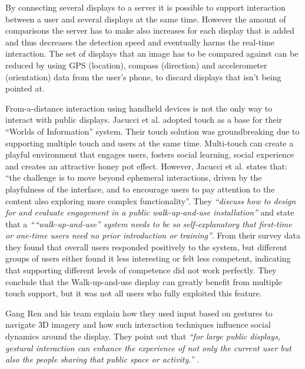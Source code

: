 By connecting several displays  to a server it is possible to support interaction between a user and several displays at the same time. However the amount of comparisons the server has to make also increases for each display that is added and thus decreases the detection speed and eventually harms the real-time interaction. The set of displays that an image has to be compared against can be reduced by using GPS (location), compass (direction) and accelerometer (orientation) data from the user's phone, to discard displays that isn't being pointed at.

From-a-distance interaction using handheld devices is not the only way to interact with public displays. %
Jacucci et al. adopted touch as a base for their ``Worlds of Information'' system. Their touch solution was groundbreaking due to supporting multiple touch and users at the same time. Multi-touch can create a playful environment that engages users, fosters social learning, social experience and creates an attractive honey pot effect. However, Jacucci et al. states that: ``the challenge is to move beyond ephemeral interactions, driven by the playfulness of 
the interface, and to encourage users to pay attention to the content also exploring more complex functionality''\cite{Jacucci:2010}.
They \emph{``discuss how to design for and evaluate engagement in a public walk-up-and-use installation''} and state that a \emph{````walk-up-and-use'' system needs to be so self-explanatory that first-time or one-time users need no prior introduction or training''}\cite{Jacucci:2010}. %
From their survey data they found that overall users responded positively to the system, but different groups of users either found it less interesting or felt less competent, indicating that supporting different levels of competence did not work perfectly. They conclude that the Walk-up-and-use display can greatly benefit from multiple touch support, but it was not all users who fully exploited this feature.

Gang Ren and his team explain how they used input based on gestures to navigate 3D imagery and how such interaction techniques influence social dynamics around the display. 
They point out that\emph{ ``for large public displays, gestural interaction can enhance the experience of not only the current user but also the people sharing that public space or activity.''} \cite{Ren:2013}.

